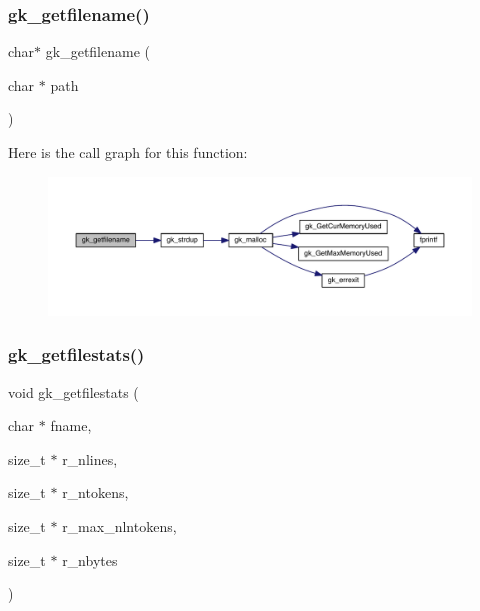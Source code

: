 \subsubsection{\texorpdfstring{gk\+\_\+getfilename()}{gk\_getfilename()}}
{\footnotesize\ttfamily char$\ast$ gk\+\_\+getfilename (\begin{DoxyParamCaption}\item[{char $\ast$}]{path }\end{DoxyParamCaption})}

Here is the call graph for this function\+:\nopagebreak
\begin{figure}[H]
\begin{center}
\leavevmode
\includegraphics[width=350pt]{a00035_a742e52c08aa7e46acd66cde95045d935_cgraph}
\end{center}
\end{figure}
\mbox{\label{a00035_a739112cb142f2e96d6952140c66cd31c}} 
\subsubsection{\texorpdfstring{gk\+\_\+getfilestats()}{gk\_getfilestats()}}
{\footnotesize\ttfamily void gk\+\_\+getfilestats (\begin{DoxyParamCaption}\item[{char $\ast$}]{fname,  }\item[{size\+\_\+t $\ast$}]{r\+\_\+nlines,  }\item[{size\+\_\+t $\ast$}]{r\+\_\+ntokens,  }\item[{size\+\_\+t $\ast$}]{r\+\_\+max\+\_\+nlntokens,  }\item[{size\+\_\+t $\ast$}]{r\+\_\+nbytes }\end{DoxyParamCaption})}

